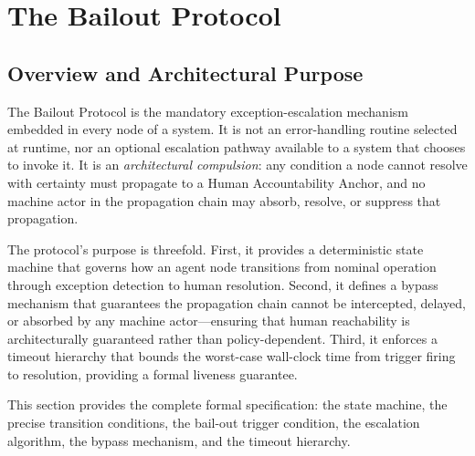 
\section{The Bailout Protocol}\label{sec:bailout}


\subsection{Overview and Architectural Purpose}\label{sec:bailout-overview}

The Bailout Protocol is the mandatory exception-escalation mechanism embedded in
every node of a \bxthree{} system. It is not an error-handling routine selected
at runtime, nor an optional escalation pathway available to a system that chooses
to invoke it. It is an \emph{architectural compulsion}: any condition a node
cannot resolve with certainty must propagate to a Human Accountability Anchor,
and no machine actor in the propagation chain may absorb, resolve, or suppress
that propagation.

The protocol's purpose is threefold. First, it provides a deterministic state
machine that governs how an agent node transitions from nominal operation through
exception detection to human resolution. Second, it defines a bypass mechanism
that guarantees the propagation chain cannot be intercepted, delayed, or absorbed
by any machine actor—ensuring that human reachability is architecturally
guaranteed rather than policy-dependent. Third, it enforces a timeout hierarchy
that bounds the worst-case wall-clock time from trigger firing to resolution,
providing a formal liveness guarantee.

This section provides the complete formal specification: the state machine,
the precise transition conditions, the bail-out trigger condition, the escalation
algorithm, the bypass mechanism, and the timeout hierarchy.


